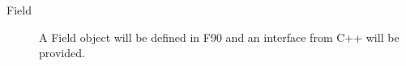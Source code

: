 


\begin{description}

\item [Field] A Field object will be defined in F90 and an interface
from C++ will be provided.

\end{description}



